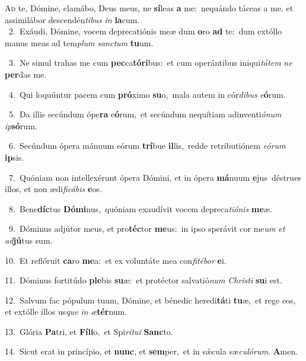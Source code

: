 \lettrine{\initial\textcolor{\initialcolor}{A}}{d} te, Dómine, clamábo, Deus meus, ne \textbf{sí}\-leas \textbf{a} me:~\star nequándo táceas a me, et assimilábor descendén\-\textit{ti}\-\textit{bus} \textit{in} \textbf{la}\-cum.\\
{\numbfont\textcolor{\numbcolor}{~2.}}~Exáudi, Dómine, vocem deprecatiónis meæ dum \textbf{o}\-ro \textbf{ad} te:~\star dum extóllo manus meas ad tem\textit{plum} \textit{sanc}\-\textit{tum} \textbf{tu}\-um.\par
{\numbfont\textcolor{\numbcolor}{~3.}}~Ne simul trahas me cum \textbf{pec}\-ca\-\textbf{tó}\-\textbf{ri}bus:~\star et cum operántibus iniqui\-\textit{tá}\-\textit{tem} \textit{ne} \textbf{per}\-das me.\par
{\numbfont\textcolor{\numbcolor}{~4.}}~Qui loquúntur pacem cum \textbf{pró}\-ximo \textbf{su}\-o,~\star mala autem in cór\-\textit{di}\-\textit{bus} \textit{e}\-\textbf{ó}rum.\par
{\numbfont\textcolor{\numbcolor}{~5.}}~Da illis secúndum ópe\textbf{ra} e\-\textbf{ó}\-rum,~\star et secúndum nequítiam adinventi\-\textit{ó}\-\textit{num} \textit{ip}\-\textbf{só}rum.\par
{\numbfont\textcolor{\numbcolor}{~6.}}~Secúndum ópera mánuum eórum \textbf{trí}\-bue \textbf{il}\-lis,~\star redde retributiónem \textit{e}\-\textit{ó}\textit{rum} \textbf{ip}\-sis.\par
{\numbfont\textcolor{\numbcolor}{~7.}}~Quóniam non intellexérunt ópera Dómini, et in ópera \textbf{má}\-nuum \textbf{e}\-jus~\star déstrues illos, et non ædi\-\textit{fi}\-\textit{cá}\textit{bis} \textbf{e}\-os.\par
{\numbfont\textcolor{\numbcolor}{~8.}}~Bene\-\textbf{díc}\-tus \textbf{Dó}\-\textbf{mi}nus,~\star quóniam exaudívit vocem depreca\-\textit{ti}\-\textit{ó}\textit{nis} \textbf{me}\-æ.\par
{\numbfont\textcolor{\numbcolor}{~9.}}~Dóminus adjútor meus, et pro\-\textbf{téc}\-tor \textbf{me}\-us:~\star in ipso sperávit cor me\textit{um} \textit{et} \textit{ad}\-\textbf{jú}tus sum.\par
{\numbfont\textcolor{\numbcolor}{10.}}~Et reflóruit \textbf{ca}\-ro \textbf{me}\-a:~\star et ex voluntáte mea con\-\textit{fi}\-\textit{té}\textit{bor} \textbf{e}\-i.\par
{\numbfont\textcolor{\numbcolor}{11.}}~Dóminus fortitúdo \textbf{ple}\-bis \textbf{su}\-æ:~\star et protéctor salvatió\textit{num} \textit{Chris}\-\textit{ti} \textbf{su}\-i est.\par
{\numbfont\textcolor{\numbcolor}{12.}}~Salvum fac pópulum tuum, Dómine, et bénedic heredi\-\textbf{tá}\-ti \textbf{tu}\-æ,~\star et rege eos, et extólle illos us\textit{que} \textit{in} \textit{æ}\-\textbf{tér}num.\par
{\numbfont\textcolor{\numbcolor}{13.}}~Glória \textbf{Pa}\-tri, et \textbf{Fí}\-\textbf{li}o,~\star et Spi\-\textit{rí}\-\textit{tu}\textit{i} \textbf{Sanc}\-to.\par
{\numbfont\textcolor{\numbcolor}{14.}}~Sicut erat in princípio, et \textbf{nunc}\-, et \textbf{sem}\-per,~\star et in sǽcula sæ\-\textit{cu}\-\textit{ló}\textit{rum}. \textbf{A}\-men.\par
